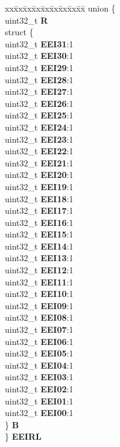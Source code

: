 \begin{DoxyCompactItemize}
\begin{tabbing}
\end{tabbing}\item 
\mbox{\label{structEDMA__tag_a129ded40a4bcaefb50194266f72784b8}} 
\begin{tabbing}
xx\=xx\=xx\=xx\=xx\=xx\=xx\=xx\=xx\=\kill
union \{\\
\>uint32\_t {\bfseries R}\\
\>struct \{\\
\>\>uint32\_t {\bfseries EEI31}:1\\
\>\>uint32\_t {\bfseries EEI30}:1\\
\>\>uint32\_t {\bfseries EEI29}:1\\
\>\>uint32\_t {\bfseries EEI28}:1\\
\>\>uint32\_t {\bfseries EEI27}:1\\
\>\>uint32\_t {\bfseries EEI26}:1\\
\>\>uint32\_t {\bfseries EEI25}:1\\
\>\>uint32\_t {\bfseries EEI24}:1\\
\>\>uint32\_t {\bfseries EEI23}:1\\
\>\>uint32\_t {\bfseries EEI22}:1\\
\>\>uint32\_t {\bfseries EEI21}:1\\
\>\>uint32\_t {\bfseries EEI20}:1\\
\>\>uint32\_t {\bfseries EEI19}:1\\
\>\>uint32\_t {\bfseries EEI18}:1\\
\>\>uint32\_t {\bfseries EEI17}:1\\
\>\>uint32\_t {\bfseries EEI16}:1\\
\>\>uint32\_t {\bfseries EEI15}:1\\
\>\>uint32\_t {\bfseries EEI14}:1\\
\>\>uint32\_t {\bfseries EEI13}:1\\
\>\>uint32\_t {\bfseries EEI12}:1\\
\>\>uint32\_t {\bfseries EEI11}:1\\
\>\>uint32\_t {\bfseries EEI10}:1\\
\>\>uint32\_t {\bfseries EEI09}:1\\
\>\>uint32\_t {\bfseries EEI08}:1\\
\>\>uint32\_t {\bfseries EEI07}:1\\
\>\>uint32\_t {\bfseries EEI06}:1\\
\>\>uint32\_t {\bfseries EEI05}:1\\
\>\>uint32\_t {\bfseries EEI04}:1\\
\>\>uint32\_t {\bfseries EEI03}:1\\
\>\>uint32\_t {\bfseries EEI02}:1\\
\>\>uint32\_t {\bfseries EEI01}:1\\
\>\>uint32\_t {\bfseries EEI00}:1\\
\>\} {\bfseries B}\\
\} {\bfseries EEIRL}\\


\end{tabbing}
\end{DoxyCompactItemize}
